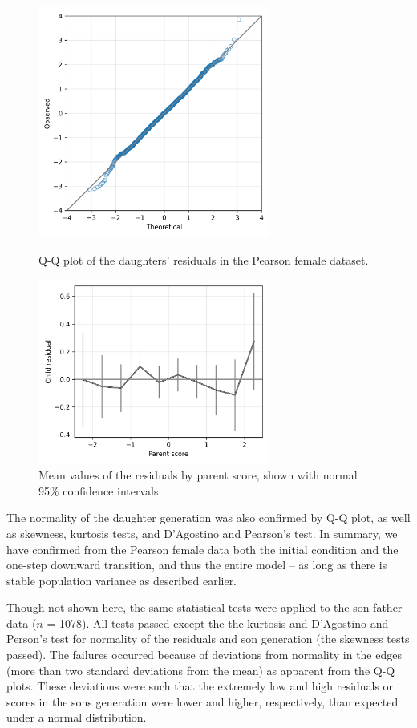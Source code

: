 \documentclass[a4paper,11pt]{article} %
\begin{document}
\begin{figure}[p]
\includegraphics[width=3in]{figures/pearson-lee-mother-daughter-qq_residuals.png}
\centering
\caption{Q-Q plot of the daughters' residuals in the Pearson female dataset.}
\label{fig:qq_pearson_epsi}

\vspace{2cm}

\includegraphics[width=3in]{figures/pearson-lee-mother-daughter-residuals_by_parent.png}
\centering
\caption{Mean values of the residuals by parent score, shown with normal 95\% confidence intervals.}
\label{fig:pearson_residuals_by_score}
\end{figure}

The normality of the daughter generation was also confirmed by Q-Q plot, as well as skewness, kurtosis tests, and D’Agostino and Pearson's test. In summary, we have confirmed from the Pearson female data both the initial condition and the one-step downward transition, and thus the entire model -- as long as there is stable population variance as described earlier. 

Though not shown here, the same statistical tests were applied to the son-father data ($n$ = 1078). All tests passed except the the kurtosis and D'Agostino and Person's test for normality of the residuals and son generation (the skewness tests passed). The failures occurred because of deviations from normality in the edges (more than two standard deviations from the mean) as apparent from the Q-Q plots. These deviations were such that the extremely low and high residuals or scores in the sons generation were lower and higher, respectively, than expected under a normal distribution. 
\end{document}

